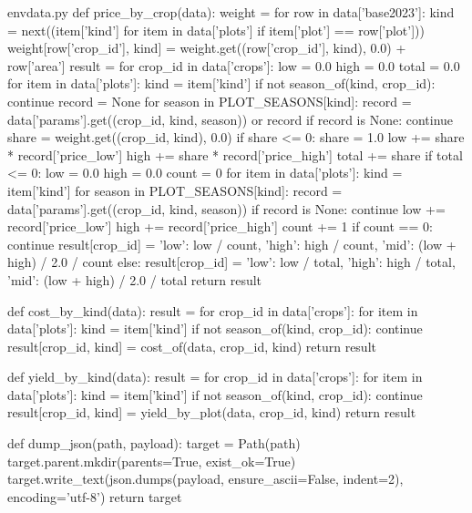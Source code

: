 \documentclass[bwprint]{gmcmthesis}
\begin{document}
\begin{appendices}
\begin{Python}{envdata.py}
def price_by_crop(data):
    weight = {}
    for row in data['base2023']:
        kind = next((item['kind'] for item in data['plots'] if item['plot'] == row['plot']))
        weight[row['crop_id'], kind] = weight.get((row['crop_id'], kind), 0.0) + row['area']
    result = {}
    for crop_id in data['crops']:
        low = 0.0
        high = 0.0
        total = 0.0
        for item in data['plots']:
            kind = item['kind']
            if not season_of(kind, crop_id):
                continue
            record = None
            for season in PLOT_SEASONS[kind]:
                record = data['params'].get((crop_id, kind, season)) or record
            if record is None:
                continue
            share = weight.get((crop_id, kind), 0.0)
            if share <= 0:
                share = 1.0
            low += share * record['price_low']
            high += share * record['price_high']
            total += share
        if total <= 0:
            low = 0.0
            high = 0.0
            count = 0
            for item in data['plots']:
                kind = item['kind']
                for season in PLOT_SEASONS[kind]:
                    record = data['params'].get((crop_id, kind, season))
                    if record is None:
                        continue
                    low += record['price_low']
                    high += record['price_high']
                    count += 1
            if count == 0:
                continue
            result[crop_id] = {'low': low / count, 'high': high / count, 'mid': (low + high) / 2.0 / count}
        else:
            result[crop_id] = {'low': low / total, 'high': high / total, 'mid': (low + high) / 2.0 / total}
    return result

def cost_by_kind(data):
    result = {}
    for crop_id in data['crops']:
        for item in data['plots']:
            kind = item['kind']
            if not season_of(kind, crop_id):
                continue
            result[crop_id, kind] = cost_of(data, crop_id, kind)
    return result

def yield_by_kind(data):
    result = {}
    for crop_id in data['crops']:
        for item in data['plots']:
            kind = item['kind']
            if not season_of(kind, crop_id):
                continue
            result[crop_id, kind] = yield_by_plot(data, crop_id, kind)
    return result

def dump_json(path, payload):
    target = Path(path)
    target.parent.mkdir(parents=True, exist_ok=True)
    target.write_text(json.dumps(payload, ensure_ascii=False, indent=2), encoding='utf-8')
    return target
\end{Python}


\end{appendices}
\end{document}
